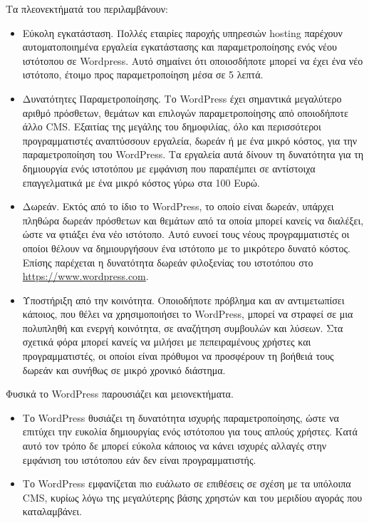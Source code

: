 \documentclass[12pt]{report}
\begin{document}
Τα πλεονεκτήματά του περιλαμβάνουν:
\begin{itemize}
\item Εύκολη εγκατάσταση. Πολλές εταιρίες παροχής υπηρεσιών \textlatin{hosting} παρέχουν αυτοματοποιημένα εργαλεία εγκατάστασης και παραμετροποίησης ενός νέου ιστότοπου σε \textlatin{Wordpress}. Αυτό σημαίνει ότι οποιοσδήποτε μπορεί να έχει ένα νέο ιστότοπο, έτοιμο προς παραμετροποίηση μέσα σε 5 λεπτά.

\item Δυνατότητες Παραμετροποίησης. Το \textlatin{WordPress} έχει σημαντικά μεγαλύτερο αριθμό πρόσθετων, θεμάτων και επιλογών παραμετροποίησης από οποιοδήποτε άλλο \textlatin{CMS}. Εξαιτίας της μεγάλης του δημοφιλίας, όλο και περισσότεροι προγραμματιστές αναπτύσσουν εργαλεία, δωρεάν ή με ένα μικρό κόστος, για την παραμετροποίηση του \textlatin{WordPress}. Τα εργαλεία αυτά δίνουν τη δυνατότητα για τη δημιουργία ενός ιστοτόπου με εμφάνιση που παραπέμπει σε αντίστοιχα επαγγελματικά με ένα μικρό κόστος γύρω στα 100 Ευρώ.

\item Δωρεάν. Εκτός από το ίδιο το \textlatin{WordPress}, το οποίο είναι δωρεάν, υπάρχει πληθώρα δωρεάν πρόσθετων και θεμάτων από τα οποία μπορεί κανείς να διαλέξει, ώστε να φτιάξει ένα νέο ιστότοπο. Αυτό ευνοεί τους νέους προγραμματιστές οι οποίοι θέλουν να δημιουργήσουν ένα ιστότοπο με το μικρότερο δυνατό κόστος. Επίσης παρέχεται η δυνατότητα δωρεάν φιλοξενίας του ιστοτόπου στο \textlatin{\url{https://www.wordpress.com}}.

\item Υποστήριξη από την κοινότητα. Οποιοδήποτε πρόβλημα και αν αντιμετωπίσει κάποιος, που θέλει να χρησιμοποιήσει το \textlatin{WordPress}, μπορεί να στραφεί σε μια πολυπληθή και ενεργή κοινότητα, σε αναζήτηση συμβουλών και λύσεων. Στα σχετικά φόρα μπορεί κανείς να μιλήσει με πεπειραμένους χρήστες και προγραμματιστές, οι οποίοι είναι πρόθυμοι να προσφέρουν τη βοήθειά τους δωρεάν και συνήθως σε μικρό χρονικό διάστημα.
\end{itemize}

Φυσικά το \textlatin{WordPress} παρουσιάζει και μειονεκτήματα.
\begin{itemize}
\item Το \textlatin{WordPress} θυσιάζει τη δυνατότητα ισχυρής παραμετροποίησης, ώστε να επιτύχει την ευκολία δημιουργίας ενός ιστότοπου για τους απλούς χρήστες. Κατά αυτό τον τρόπο δε μπορεί εύκολα κάποιος να κάνει ισχυρές αλλαγές στην εμφάνιση του ιστότοπου εάν δεν είναι προγραμματιστής.

\item Το \textlatin{WordPress} εμφανίζεται πιο ευάλωτο σε επιθέσεις σε σχέση με τα υπόλοιπα \textlatin{CMS}, κυρίως λόγω της μεγαλύτερης βάσης χρηστών και του μεριδίου αγοράς που καταλαμβάνει.
\end{itemize}
\end{document}
